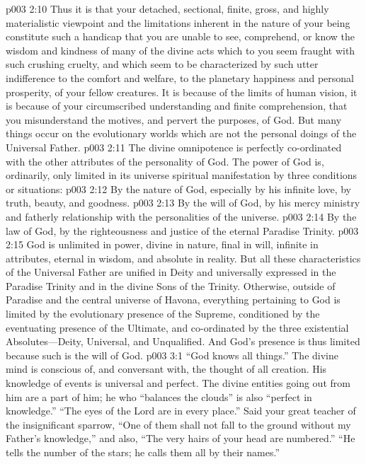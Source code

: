 \vs p003 2:10 Thus it is that your detached, sectional, finite, gross, and highly materialistic viewpoint and the limitations inherent in the nature of your being constitute such a handicap that you are unable to see, comprehend, or know the wisdom and kindness of many of the divine acts which to you seem fraught with such crushing cruelty, and which seem to be characterized by such utter indifference to the comfort and welfare, to the planetary happiness and personal prosperity, of your fellow creatures. It is because of the limits of human vision, it is because of your circumscribed understanding and finite comprehension, that you misunderstand the motives, and pervert the purposes, of God. But many things occur on the evolutionary worlds which are not the personal doings of the Universal Father.
\pc \vs p003 2:11 The divine omnipotence is perfectly co\hyp{}ordinated with the other attributes of the personality of God. The power of God is, ordinarily, only limited in its universe spiritual manifestation by three conditions or situations:
\pc \vs p003 2:12 \bibnobreakspace By the nature of God, especially by his infinite love, by truth, beauty, and goodness.\plusone
\vs p003 2:13 \bibnobreakspace By the will of God, by his mercy ministry and fatherly relationship with the personalities of the universe.
\vs p003 2:14 \bibnobreakspace By the law of God, by the righteousness and justice of the eternal Paradise Trinity.
\pc \vs p003 2:15 God is unlimited in power, divine in nature, final in will, infinite in attributes, eternal in wisdom, and absolute in reality. But all these characteristics of the Universal Father are unified in Deity and universally expressed in the Paradise Trinity and in the divine Sons of the Trinity. Otherwise, outside of Paradise and the central universe of Havona, everything pertaining to God is limited by the evolutionary presence of the Supreme, conditioned by the eventuating presence of the Ultimate, and co\hyp{}ordinated by the three existential Absolutes---Deity, Universal, and Unqualified. And God’s presence is thus limited because such is the will of God.
\vs p003 3:1 “God knows all things.” The divine mind is conscious of, and conversant with, the thought of all creation. His knowledge of events is universal and perfect. The divine entities going out from him are a part of him; he who “balances the clouds” is also “perfect in knowledge.” “The eyes of the Lord are in every place.” Said your great teacher of the insignificant sparrow, “One of them shall not fall to the ground without my Father’s knowledge,” and also, “The very hairs of your head are numbered.” “He tells the number of the stars; he calls them all by their names.”
